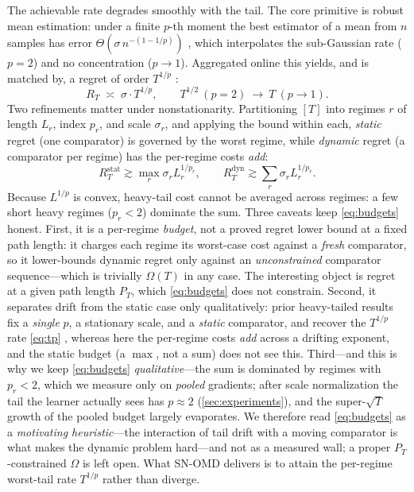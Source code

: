 \documentclass{article}
\begin{document}
The achievable rate degrades smoothly with the tail. The core primitive is robust mean
estimation: under a finite $p$-th moment the best estimator of a mean from $n$ samples
has error $\Theta(\sigma\,n^{-(1-1/p)})$ \citep{devroye2016,lugosi2019}, which
interpolates the sub-Gaussian rate ($p=2$) and no concentration ($p\to1$). Aggregated
online this yields, and is matched by, a regret of order $T^{1/p}$
\citep{liu2026oco}:
\begin{equation}
\label{eq:tp}
R_T \;\asymp\; \sigma\cdot T^{1/p},\qquad
T^{1/2}\ (p{=}2)\ \longrightarrow\ T\ (p\to1).
\end{equation}
Two refinements matter under nonstationarity. Partitioning $[T]$ into regimes $r$ of
length $L_r$, index $p_r$, and scale $\sigma_r$, and applying the bound within each,
\emph{static} regret (one comparator) is governed by the worst regime, while
\emph{dynamic} regret (a comparator per regime) has the per-regime costs \emph{add}:
\begin{equation}
\label{eq:budgets}
R_T^{\mathrm{stat}}\gtrsim\max_r \sigma_r L_r^{1/p_r},
\qquad
R_T^{\mathrm{dyn}}\gtrsim\sum_r \sigma_r L_r^{1/p_r}.
\end{equation}
Because $L^{1/p}$ is convex, heavy-tail cost cannot be averaged across regimes: a few
short heavy regimes ($p_r<2$) dominate the sum. Three caveats keep \eqref{eq:budgets}
honest. First, it is a per-regime \emph{budget}, not a proved regret lower bound at a
fixed path length: it charges each regime its worst-case cost against a \emph{fresh}
comparator, so it lower-bounds dynamic regret only against an \emph{unconstrained}
comparator sequence---which is trivially $\Omega(T)$ in any case. The interesting object
is regret at a given path length $P_T$, which \eqref{eq:budgets} does not constrain.
Second, it separates drift from the static case only qualitatively: prior heavy-tailed
results fix a \emph{single} $p$, a stationary scale, and a \emph{static} comparator, and
recover the $T^{1/p}$ rate \eqref{eq:tp} \citep{liu2026oco,zhangcutkosky2022,bubeck2013},
whereas here the per-regime costs \emph{add} across a drifting exponent, and the static
budget (a $\max$, not a sum) does not see this. Third---and this is why we keep
\eqref{eq:budgets} \emph{qualitative}---the sum is dominated by regimes with $p_r<2$,
which we measure only on \emph{pooled} gradients; after scale normalization the tail the
learner actually sees has $p\approx2$ (\cref{sec:experiments}), and the super-$\sqrt T$
growth of the pooled budget largely evaporates. We therefore read \eqref{eq:budgets} as
a \emph{motivating heuristic}---the interaction of tail drift with a moving comparator is
what makes the dynamic problem hard---and not as a measured wall; a proper
$P_T$-constrained $\Omega$ is left open. What SN-OMD delivers is to attain the per-regime
worst-tail rate $T^{1/p}$ rather than diverge.
\end{document}

